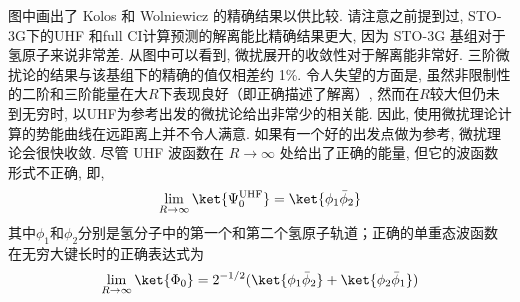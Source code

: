 图中画出了 Kolos 和 Wolniewicz 的精确结果以供比较. 
请注意之前提到过, STO-3G下的UHF 和full CI计算预测的解离能比精确结果更大, 因为 STO-3G 基组对于氢原子来说非常差.  
从图中可以看到, 微扰展开的收敛性对于解离能非常好.  三阶微扰论的结果与该基组下的精确的值仅相差约 1\%.  
令人失望的方面是, 虽然非限制性的二阶和三阶能量在大$R$下表现良好（即正确描述了解离）, 然而在$R$较大但仍未到无穷时, 以UHF为参考出发的微扰论给出非常少的相关能. 
因此, 使用微扰理论计算的势能曲线在远距离上并不令人满意.  如果有一个好的出发点做为参考, 微扰理论会很快收敛.  尽管 UHF 波函数在 $R\to\infty$ 处给出了正确的能量, 但它的波函数形式不正确, 即, 
\begin{align}
	\lim_{R\to\infty} \ket{\Psi_0^\mathrm{UHF}} = \ket{\phi_1\bar{\phi}_2}
\end{align}
其中$\phi_1$和$\phi_2$分别是氢分子中的第一个和第二个氢原子轨道；正确的单重态波函数在无穷大键长时的正确表达式为
\begin{align}
	\lim_{R\to\infty}\ket{\Phi_0} = 2^{-1/2}(\ket{\phi_1\bar{\phi}_2}+\ket{\phi_2\bar{\phi}_1})
\end{align}
